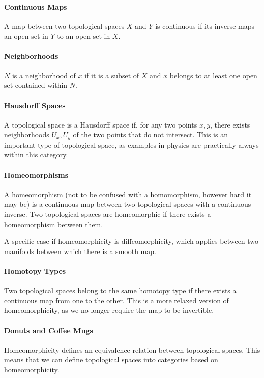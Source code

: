 \paragraph{Continuous Maps}
A map between two topological spaces $X$ and $Y$ is continuous if its inverse maps an open set in $Y$ to an open set in $X$.

\paragraph{Neighborhoods}
$N$ is a neighborhood of $x$ if it is a subset of $X$ and $x$ belongs to at least one open set contained within $N$.

\paragraph{Hausdorff Spaces}
A topological space is a Hausdorff space if, for any two points $x, y$, there exists neighborhoods $U_{x}, U_{y}$ of the two points that do not intersect. This is an important type of topological space, as examples in physics are practically always within this category.

\paragraph{Homeomorphisms}
A homeomorphism (not to be confused with a homomorphism, however hard it may be) is a continuous map between two topological spaces with a continuous inverse. Two topological spaces are homeomorphic if there exists a homeomorphism between them.

A specific case if homeomorphicity is diffeomorphicity, which applies between two manifolds between which there is a smooth map.

\paragraph{Homotopy Types}
Two topological spaces belong to the same homotopy type if there exists a continuous map from one to the other. This is a more relaxed version of homeomorphicity, as we no longer require the map to be invertible.

\paragraph{Donuts and Coffee Mugs}
Homeomorphicity defines an equivalence relation between topological spaces. This means that we can define topological spaces into categories based on homeomorphicity.

